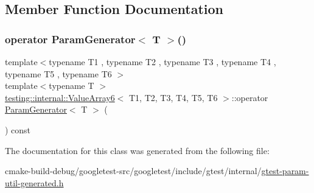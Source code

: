 \subsection{Member Function Documentation}
\mbox{\label{classtesting_1_1internal_1_1ValueArray6_ab6cb557146bca7cf5fcfa40f10dee9da}} 
\subsubsection{\texorpdfstring{operator ParamGenerator$<$ T $>$()}{operator ParamGenerator< T >()}}
{\footnotesize\ttfamily template$<$typename T1 , typename T2 , typename T3 , typename T4 , typename T5 , typename T6 $>$ \\
template$<$typename T $>$ \\
\mbox{\hyperlink{classtesting_1_1internal_1_1ValueArray6}{testing\+::internal\+::\+Value\+Array6}}$<$ T1, T2, T3, T4, T5, T6 $>$\+::operator \mbox{\hyperlink{classtesting_1_1internal_1_1ParamGenerator}{Param\+Generator}}$<$ T $>$ (\begin{DoxyParamCaption}{ }\end{DoxyParamCaption}) const\hspace{0.3cm}{\ttfamily [inline]}}



The documentation for this class was generated from the following file\+:\begin{DoxyCompactItemize}
\item 
cmake-\/build-\/debug/googletest-\/src/googletest/include/gtest/internal/\mbox{\hyperlink{gtest-param-util-generated_8h}{gtest-\/param-\/util-\/generated.\+h}}\end{DoxyCompactItemize}
